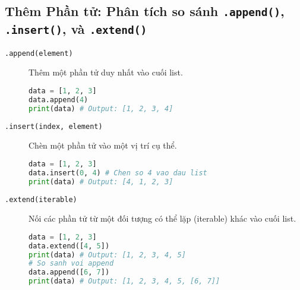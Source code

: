 \documentclass[11pt]{article}
\begin{document}
\subsection{Thêm Phần tử: Phân tích so sánh \texttt{.append()}, \texttt{.insert()}, và \texttt{.extend()}}
\begin{description}
    \item[\texttt{.append(element)}] Thêm một phần tử duy nhất vào cuối list.
    \begin{lstlisting}[language=Python]
data = [1, 2, 3]
data.append(4)
print(data) # Output: [1, 2, 3, 4]
    \end{lstlisting}
    \item[\texttt{.insert(index, element)}] Chèn một phần tử vào một vị trí cụ thể.
    \begin{lstlisting}[language=Python]
data = [1, 2, 3]
data.insert(0, 4) # Chen so 4 vao dau list
print(data) # Output: [4, 1, 2, 3]
    \end{lstlisting}
    \item[\texttt{.extend(iterable)}] Nối các phần tử từ một đối tượng có thể lặp (iterable) khác vào cuối list.
    \begin{lstlisting}[language=Python]
data = [1, 2, 3]
data.extend([4, 5])
print(data) # Output: [1, 2, 3, 4, 5]
# So sanh voi append
data.append([6, 7])
print(data) # Output: [1, 2, 3, 4, 5, [6, 7]]
    \end{lstlisting}
\end{description}
\end{document}
